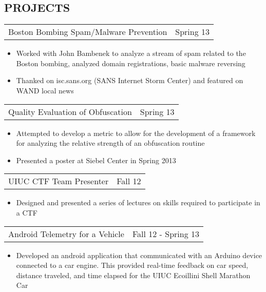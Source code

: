 \documentclass[margin]{res}
\begin{document}
\begin{resume}
\section{PROJECTS}
\begin{tabular}{p{3in} r} %
Boston Bombing Spam/Malware Prevention & Spring 13
\end{tabular}
\begin{itemize} \itemsep -2pt
\item Worked with John Bambenek to analyze a stream of spam related
  to the Boston bombing, analyzed domain registrations, basic malware
  reversing
\item Thanked on isc.sans.org (SANS Internet Storm Center) and featured on WAND local news
\end{itemize}
\begin{tabular}{p{3in} r} %
Quality Evaluation of Obfuscation & Spring 13
\end{tabular}
\begin{itemize} \itemsep -2pt
\item Attempted to develop a metric to allow for the development of
  a framework for analyzing the relative strength of an obfuscation
  routine
\item Presented a poster at Siebel Center in Spring 2013
\end{itemize}
\begin{tabular}{p{3in} r} %
UIUC CTF Team Presenter & Fall 12
\end{tabular}
\begin{itemize} \itemsep -2pt
\item  Designed and presented a series of lectures on skills required to
  participate in a CTF
\end{itemize}
\begin{tabular}{p{3in} r} %
Android Telemetry for a Vehicle & Fall 12 - Spring 13
\end{tabular}
\begin{itemize} \itemsep -2pt
\item Developed an android application that communicated with an
  Arduino device connected to a car engine.  This provided real-time
  feedback on car speed, distance traveled, and time elapsed for the
  UIUC Ecoillini Shell Marathon Car
\end{itemize}

\end{resume}
\end{document}
